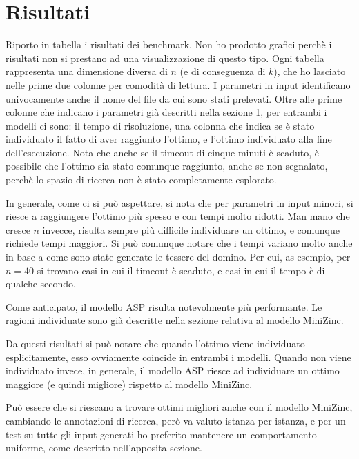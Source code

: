 \documentclass[12pt,a4paper,english,italian]{article}
\begin{document}
\section{Risultati}
Riporto in tabella i risultati dei benchmark. Non ho prodotto grafici perchè i risultati non si prestano ad una visualizzazione di questo tipo. Ogni tabella rappresenta una dimensione diversa di $n$ (e di conseguenza di $k$), che ho lasciato nelle prime due colonne per comodità di lettura. I parametri in input identificano univocamente anche il nome del file da cui sono stati prelevati.
Oltre alle prime colonne che indicano i parametri già descritti nella sezione 1, per entrambi i modelli ci sono: il tempo di risoluzione, una colonna che indica se è stato individuato il fatto di aver raggiunto l'ottimo, e l'ottimo individuato alla fine dell'esecuzione. Nota che anche se il timeout di cinque minuti è scaduto, è possibile che l'ottimo sia stato comunque raggiunto, anche se non segnalato, perchè lo spazio di ricerca non è stato completamente esplorato.

In generale, come ci si può aspettare, si nota che per parametri in input minori, si riesce a raggiungere l'ottimo più spesso e con tempi molto ridotti. Man mano che cresce $n$ invecce, risulta sempre più difficile individuare un ottimo, e comunque richiede tempi maggiori. Si può comunque notare che i tempi variano molto anche in base a come sono state generate le tessere del domino. Per cui, as esempio, per $n = 40$ si trovano casi in cui il timeout è scaduto, e casi in cui il tempo è di qualche secondo.

Come anticipato, il modello ASP risulta notevolmente più performante. Le ragioni individuate sono già descritte nella sezione relativa al modello MiniZinc. 

Da questi risultati si può notare che quando l'ottimo viene individuato esplicitamente, esso ovviamente coincide in entrambi i modelli. Quando non viene individuato invece, in generale, il modello ASP riesce ad individuare un ottimo maggiore (e quindi migliore) rispetto al modello MiniZinc.

Può essere che si riescano a trovare ottimi migliori anche con il modello MiniZinc, cambiando le annotazioni di ricerca, però va valuto istanza per istanza, e per un test su tutte gli input generati ho preferito mantenere un comportamento uniforme, come descritto nell'apposita sezione.
\end{document}

